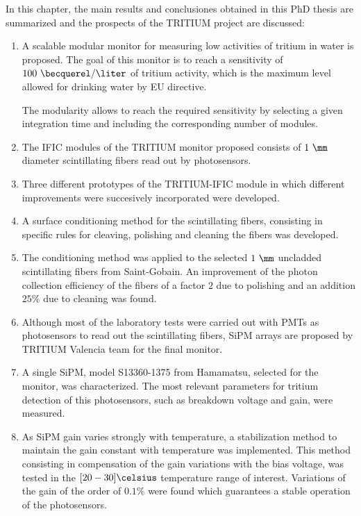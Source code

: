 In this chapter, the main results and conclusiones obtained in this PhD thesis are summarized and the prospects of the TRITIUM project are discussed:

\begin{enumerate}
\item{} A scalable modular monitor for measuring low activities of tritium in water is proposed. The goal of this monitor is to reach a sensitivity of $100~\becquerel/\liter$ of tritium activity, which is the maximum level allowed for drinking water by EU directive.

The modularity allows to reach the required sensitivity by selecting a given integration time and including the corresponding number of modules.

\item{} The IFIC modules of the TRITIUM monitor proposed consists of $1~\mm$ diameter scintillating fibers read out by photosensors.

\item{} Three different prototypes of the TRITIUM-IFIC module in which different improvements were succesively incorporated were developed.

\item{} A surface conditioning method for the scintillating fibers, consisting in specific rules for cleaving, polishing and cleaning the fibers was developed.

\item{} The conditioning method was applied to the selected $1~\mm$ uncladded scintillating fibers from Saint-Gobain. An improvement of the photon collection efficiency of the fibers of a factor $2$ due to polishing and an addition $25\%$ due to cleaning was found.

\item{} Although most of the laboratory tests were carried out with PMTs as photosensors to read out the scintillating fibers, SiPM arrays are proposed by TRITIUM Valencia team for the final monitor. 

\item{} A single SiPM, model S13360-1375 from Hamamatsu, selected for the monitor, was characterized. The most relevant parameters for tritium detection of this photosensors, such as breakdown voltage and gain, were measured.

\item{} As SiPM gain varies strongly with temperature, a stabilization method to maintain the gain constant with temperature was implemented. This method consisting in compensation of the gain variations with the bias voltage, was tested in the $[20-30]\celsius$ temperature range of interest. Variations of the gain of the order of $0.1\%$ were found which guarantees a stable operation of the photosensors.


\end{enumerate}
